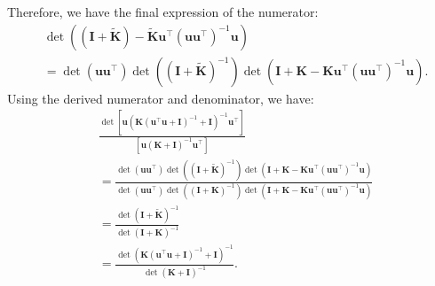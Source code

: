 Therefore, we have the final expression of the numerator:
\begin{align*}
    &\det \left( (\mathbf{I} + \widetilde{\mathbf{K}}) - \widetilde{\mathbf{K}}\mathbf{u}^\top (\mathbf{u} \mathbf{u}^\top)^{-1} \mathbf{u}\right) 
\\
    &= \det (\mathbf{u} \mathbf{u}^\top) \det \left((\mathbf{I}+\widetilde{\mathbf{K}})^{-1}\right) \det \left( \mathbf{I} + \mathbf{K} - \mathbf{K} \mathbf{u}^\top (\mathbf{u} \mathbf{u}^\top)^{-1}  \mathbf{u} \right).
\end{align*}
Using the derived numerator and denominator, we have:
\begin{align*}
    & \frac{\det [\mathbf{u}\left(\mathbf{K}(\mathbf{u}^\top\mathbf{u}+\mathbf{I})^{-1} + \mathbf{I}\right)^{-1}\mathbf{u}^\top]}{[\mathbf{u}\left(\mathbf{K} + \mathbf{I}\right)^{-1}\mathbf{u}^\top]} 
\\
    &= \frac{\det (\mathbf{u} \mathbf{u}^\top) \det \left((\mathbf{I}+\widetilde{\mathbf{K}})^{-1}\right) \det \left( \mathbf{I} + \mathbf{K} - \mathbf{K} \mathbf{u}^\top (\mathbf{u} \mathbf{u}^\top)^{-1}  \mathbf{u} \right)}{\det (\mathbf{u} \mathbf{u}^\top) \det \left((\mathbf{I}+\mathbf{K})^{-1}\right) \det \left(\mathbf{I} + \mathbf{K} - \mathbf{K}\mathbf{u}^\top (\mathbf{u} \mathbf{u}^\top)^{-1} \mathbf{u}\right)}
\\
    &=\frac{\det (\mathbf{I}+\widetilde{\mathbf{K}})^{-1}}{\det (\mathbf{I}+\mathbf{K})^{-1}} 
\\
    &=\frac{\det \left(\mathbf{K}(\mathbf{u}^\top\mathbf{u}+\mathbf{I})^{-1} + \mathbf{I}\right)^{-1}}{\det \left(\mathbf{K} + \mathbf{I}\right)^{-1}}.   
    \end{align*} 

